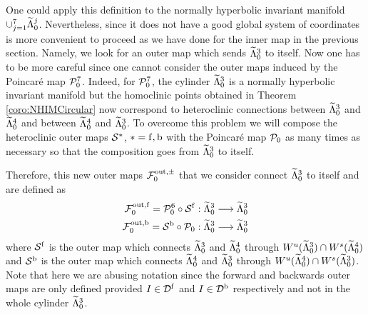 One could apply this definition to the normally hyperbolic invariant 
manifold $\cup_{j=1}^7 \widetilde\Lambda^j_0$. Nevertheless, since it does not 
have a good global system of coordinates is more convenient to proceed 
as we have done for the inner map in the previous section. Namely, 
we look for an outer map which sends $\widetilde\Lambda_0^3$ to itself.  Now 
one has to be more careful since one cannot consider the outer maps 
induced by the Poincar\'e map $\mathcal{P}_0^7$. Indeed, for $\mathcal{P}_0^7$, 
the cylinder $\widetilde\Lambda_0^3$ is a normally hyperbolic invariant manifold 
but the homoclinic points obtained in Theorem \ref{coro:NHIMCircular} 
now correspond to heteroclinic connections between $\widetilde\Lambda_0^3$ and 
$\widetilde\Lambda_0^4$ and between  $\widetilde\Lambda_0^4$ and $\widetilde\Lambda_0^3$. 
To overcome this problem we will compose the heteroclinic outer maps 
$\mathcal{S}^{\ast}$, $*=\mathrm{f},\mathrm{b}$ with the Poincar\'e map $\mathcal{P}_0$ as many times 
as necessary so that the composition goes from $\widetilde\Lambda_0^3$ to itself.


Therefore, this new outer maps $\mathcal{F}_0^{\mathrm{out},\pm}$ that we consider connect $\widetilde\Lambda_0^3$ to itself and are defined as
\begin{equation}\label{def:OuterCircular:Composition}
 \begin{split}
  \mathcal{F}_0^{\mathrm{out},\mathrm{f}}=\mathcal{P}_0^6\circ\mathcal{S}^{\mathrm{f}}: \widetilde\Lambda_0^3\longrightarrow \widetilde\Lambda_0^3\\
  \mathcal{F}_0^{\mathrm{out},\mathrm{b}}=\mathcal{S}^{\mathrm{b}}\circ\mathcal{P}_0: \widetilde\Lambda_0^3\longrightarrow \widetilde\Lambda_0^3
 \end{split}
\end{equation}
where $\mathcal{S}^{\mathrm{f}}$ is the outer map which connects $\widetilde\Lambda_0^3$ and $\widetilde\Lambda_0^4$ through $W^u(\widetilde\Lambda_0^3)\cap W^s(\widetilde\Lambda_0^4)$ and $\mathcal{S}^{\mathrm{b}}$ is the outer map which connects $\widetilde\Lambda_0^4$ and $\widetilde\Lambda_0^3$ through $W^u(\widetilde\Lambda_0^4)\cap W^s(\widetilde\Lambda_0^3)$. Note that here we are abusing notation since the forward and backwards outer maps are only defined provided $I\in \mathcal{D}^{\mathrm{f}}$ and $I\in\mathcal{D}^{\mathrm{b}}$ respectively and not in the whole cylinder $\widetilde\Lambda_0^3$.

